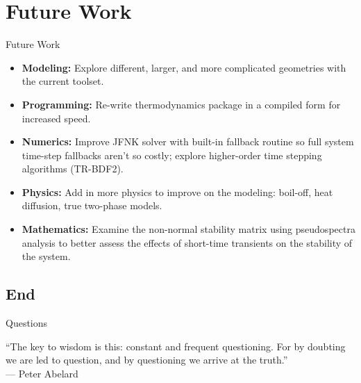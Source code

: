 \documentclass[10pt,t,xcolor=table,compress]{UWMadBeamer}
\begin{document}
    
    
\section{Future Work}
    \begin{frame}{Future Work}
        \begin{itemize}
            \item \textbf{Modeling:} Explore different, larger, and more complicated geometries with the current toolset.
            \item \textbf{Programming:} Re-write thermodynamics package in a compiled form for increased speed.
            \item \textbf{Numerics:} Improve JFNK solver with built-in fallback routine so full system time-step fallbacks aren't so costly; explore higher-order time stepping algorithms (TR-BDF2).
            \item \textbf{Physics:} Add in more physics to improve on the modeling: boil-off, heat diffusion, true two-phase models.
            \item \textbf{Mathematics:} Examine the non-normal stability matrix using pseudospectra analysis to better assess the effects of short-time transients on the stability of the system.
        \end{itemize}
    \end{frame}
    

    \subsection*{End}
    \begin{frame}[c]{Questions}
        \begin{center}
                ``The key to wisdom is this: constant and frequent questioning. 
                  For by doubting we are led to question, and by questioning we arrive at the truth.''\\
                \hfill --- Peter Abelard
        \end{center}
    \end{frame}







\appendix

\end{document}
